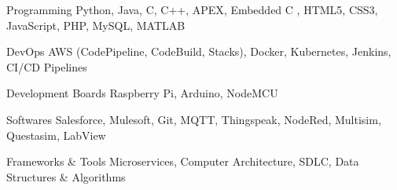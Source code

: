 

\begin{cvskills}

  \cvskill
    {Programming} %
    {Python, Java, C, C++, APEX, Embedded C , HTML5, CSS3, JavaScript, PHP, MySQL, MATLAB} %

  \cvskill
    {DevOps} %
    {AWS (CodePipeline, CodeBuild, Stacks), Docker, Kubernetes, Jenkins, CI/CD Pipelines } %

  \cvskill
    {Development Boards} %
    {Raspberry Pi, Arduino, NodeMCU} %

  \cvskill
    {Softwares} %
    {Salesforce, Mulesoft, Git, MQTT, Thingspeak, NodeRed, Multisim, Questasim, LabView} %

  \cvskill
    {Frameworks \& Tools} %
    {Microservices, Computer Architecture, SDLC, Data Structures \& Algorithms} %

\end{cvskills}

